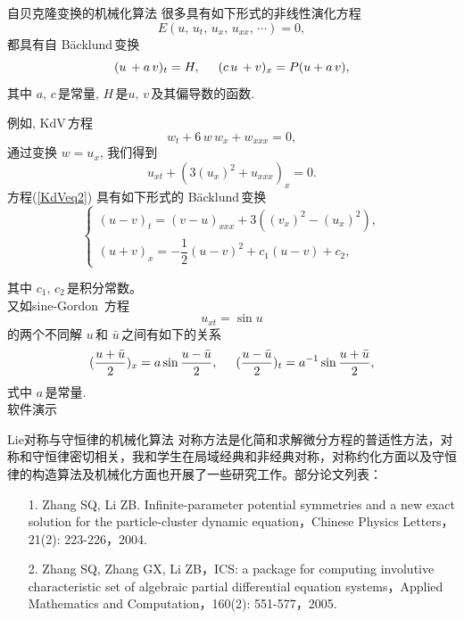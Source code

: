 \documentclass{beamer}
\begin{document}
\begin{frame}{自贝克隆变换的机械化算法}
很多具有如下形式的非线性演化方程
\begin{equation}\label{eq344}
E(u,\,u_t,\,u_x,\,u_{xx},\,\cdots)=0,
\end{equation}
都具有自 B\"{a}cklund\,变换
\begin{equation}\label{eq345}
(u\,+ a\,v)_t = H,\hskip 0.5cm (c\,u\, + v)_x =P(u + a\,v),
\end{equation}
其中 $a,\,c$\,是常量, $H$\,是$u,\,v$\,及其偏导数的函数.

例如, KdV\,方程
\begin{equation}\label{KdV}
w_t+6\,w\,w_x+w_{xxx}=0,
\end{equation}
通过变换 $w=u_x$, 我们得到
\begin{equation}\label{KdVeq2}
u_{xt}+(3(u_x)^2+u_{xxx})_x=0.
\end{equation}
方程(\ref{KdVeq2}) 具有如下形式的 B\"{a}cklund\,变换
\begin{equation}\label{KdV_BT}
\left \{
\begin{array}{ll}
(u-v)_t=(v-u)_{xxx}+3((v_x)^2-(u_x)^2), \\[2mm]
(u+v)_x=-\dfrac{1}{2}(u-v)^2+c_1(u-v)+c_2,
\end{array}
\right.
\end{equation}
\end{frame}
\begin{frame}
其中 $c_1,\,c_2$\,是积分常数。\\[1mm]

又如sine-Gordon\, 方程
\[
  u_{xt} = \sin u
\]
的两个不同解 $u$\,和 $\bar{u}$\,之间有如下的关系
\begin{equation}
(\dfrac{u +\bar{u}}{2})_x = a \sin \dfrac{u-\bar{u}}{2}, \hskip
0.5cm (\dfrac{u-\bar{u}}{2})_t = a^{-1} \sin \dfrac{u + \bar{u}}{2},
\end{equation}
式中 $a$\,是常量.\\[2mm]
\mbox{}  \hskip 3cm  软件演示
\end{frame}

\begin{frame}{Lie对称与守恒律的机械化算法}
 对称方法是化简和求解微分方程的普适性方法，对称和守恒律密切相关，我和学生在局域经典和非经典对称，对称约化方面以及守恒律的构造算法及机械化方面也开展了一些研究工作。部分论文列表：
 \begin{itemize}
  \item[1.] Zhang SQ, Li ZB. Infinite-parameter potential symmetries and a new exact solution for the particle-cluster dynamic equation，Chinese Physics Letters，21(2): 223-226，2004.
  \item[2.] Zhang SQ, Zhang GX, Li ZB，ICS: a package for computing involutive characteristic set of algebraic partial differential equation systems，Applied Mathematics and Computation，160(2): 551-577，2005.
 \end{itemize}
\end{frame}
\end{document}
